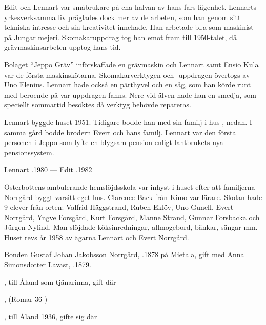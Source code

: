 Edit och Lennart var småbrukare på ena halvan av hans fars lägenhet. Lennarts yrkesverksamma liv präglades dock mer av de arbeten, som han genom sitt tekniska intresse och sin kreativitet innehade. Han arbetade bl.a som maskinist på Jungar mejeri. Skomakaruppdrag tog han emot fram till 1950-talet, då grävmaskinsarbeten upptog hans tid.

Bolaget ``Jeppo Gräv'' införskaffade en grävmaskin och Lennart samt Ensio Kula var de första maskinskötarna. Skomakarverktygen och -uppdragen övertogs av Uno Elenius. Lennart hade också en pärthyvel och en såg, som han körde runt med beroende på var uppdragen fanns. Nere vid älven hade han en smedja, som speciellt sommartid besöktes då verktyg behövde repareras.

Lennart byggde huset 1951. Tidigare bodde han med sin familj i hus , nedan. I samma gård bodde brodern Evert och hans familj. Lennart var den första personen i Jeppo som lyfte en blygsam pension enligt lantbrukets nya pensionssystem.

Lennart .1980  ---  Edit .1982





Österbottens ambulerande hemslöjdsskola var inhyst i huset efter att familjerna Norrgård byggt varsitt eget hus. Clarence Back från Kimo var lärare. Skolan hade 9 elever från orten: Valfrid Häggstrand, Ruben Eklöv, Uno Gunell, Evert Norrgård, Yngve Forsgård, Kurt Forsgård, Manne Strand, Gunnar Forsbacka och Jürgen Nylind. Man slöjdade köksinredningar, allmogebord, bänkar, sängar mm. Huset revs år 1958 av ägarna Lennart och Evert Norrgård.



Bonden Gustaf Johan Jakobsson Norrgård, .1878 på Mietala, gift med Anna Simonsdotter Lavast, .1879.
\begin{jhchildren}
  \item {}, till Åland som tjänarinna, gift där
  \item {}
  \item {}
  \item {}
  \item {}, (Romar 36 )
  \item {}, till Åland 1936, gifte sig där
\end{jhchildren}

